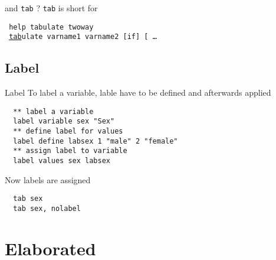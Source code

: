 \begin{frame}[fragile]{and \texttt{tab} ?}
\texttt{tab} is short for\\ \vspace{0.5cm}  
\begin{scriptsize}
\texttt{
  \textcolor{Statakeywords}{help tabulate twoway} \\
  ~\underline{tab}ulate \textcolor{Statakeywords}{varname1} \textcolor{Statakeywords}{varname2} [\textcolor{Statakeywords}{if}] [ \dots
} \vspace{0.5cm}
\end{scriptsize}

\end{frame}

\subsection{Label}
\begin{frame}[fragile]{Label}     
To label a variable, lable have to be defined and afterwards applied
\begin{lstlisting}
  ** label a variable
  label variable sex "Sex"
  ** define label for values
  label define labsex 1 "male" 2 "female"
  ** assign label to variable
  label values sex labsex 
\end{lstlisting}
Now labels are assigned
\begin{lstlisting}
  tab sex
  tab sex, nolabel
\end{lstlisting}
\end{frame}

\section{Elaborated}
